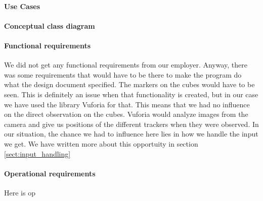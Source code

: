 \paragraph{Use Cases}

\paragraph{Conceptual class diagram}

\paragraph{Functional requirements}
We did not get any functional requirements from our employer. Anyway, there was
some requirements that would have to be there to make the program do what the
design document specified. The markers on the cubes would have to be seen. This
is definitely an issue when that functionality is created, but in our case we
have used the library \gls{Vuforia} for that. This means that we had no
influence on the direct observation on the cubes. Vuforia would analyze images
from the camera and give us positions of the different trackers when they were
observed. In our situation, the chance we had to influence here lies in how we
handle the input we get. We have written more about this opportuity in section
\ref{sect:input_handling}

\paragraph{Operational requirements}
Here is op